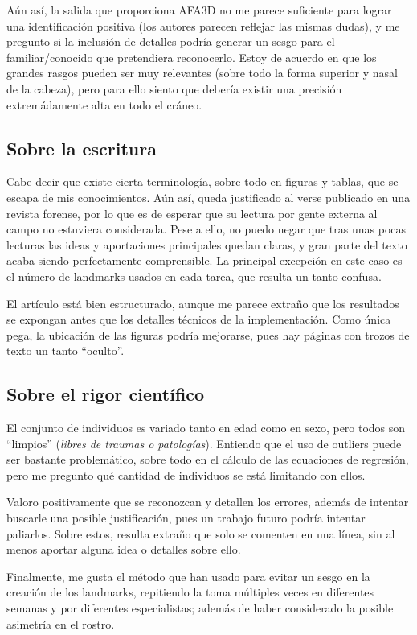 \documentclass[13pt,a4paper]{article}
\begin{document}
Aún así, la salida que proporciona AFA3D no me parece suficiente para lograr una identificación positiva (los autores parecen reflejar las mismas dudas), y me pregunto si la inclusión de detalles podría generar un sesgo para el familiar/conocido que pretendiera reconocerlo. Estoy de acuerdo en que los grandes rasgos pueden ser muy relevantes (sobre todo la forma superior y nasal de la cabeza), pero para ello siento que debería existir una precisión extremádamente alta en todo el cráneo.

\subsection{Sobre la escritura}

Cabe decir que existe cierta terminología, sobre todo en figuras y tablas, que se escapa de mis conocimientos. Aún así, queda justificado al verse publicado en una revista forense, por lo que es de esperar que su lectura por gente externa al campo no estuviera considerada. Pese a ello, no puedo negar que tras unas pocas lecturas las ideas y aportaciones principales quedan claras, y gran parte del texto acaba siendo perfectamente comprensible. La principal excepción en este caso es el número de landmarks usados en cada tarea, que resulta un tanto confusa.

El artículo está bien estructurado, aunque me parece extraño que los resultados se expongan antes que los detalles técnicos de la implementación. Como única pega, la ubicación de las figuras podría mejorarse, pues hay páginas con trozos de texto un tanto ``oculto''.

\subsection{Sobre el rigor científico}

El conjunto de individuos es variado tanto en edad como en sexo, pero todos son ``limpios'' (\textit{libres de traumas o patologías}). Entiendo que el uso de outliers puede ser bastante problemático, sobre todo en el cálculo de las ecuaciones de regresión, pero me pregunto qué cantidad de individuos se está limitando con ellos.

Valoro positivamente que se reconozcan y detallen los errores, además de intentar buscarle una posible justificación, pues un trabajo futuro podría intentar paliarlos.
Sobre estos, resulta extraño que solo se comenten en una línea, sin al menos aportar alguna idea o detalles sobre ello.

Finalmente, me gusta el método que han usado para evitar un sesgo en la creación de los landmarks, repitiendo la toma múltiples veces en diferentes semanas y por diferentes especialistas; además de haber considerado la posible asimetría en el rostro.


    \setlength{\parskip}{1em}
    \newpage
\end{document}
